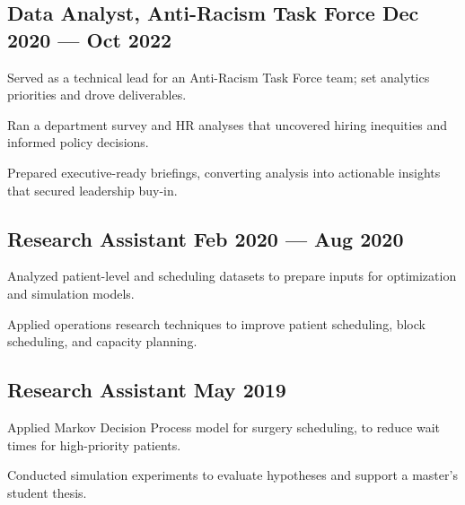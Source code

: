 \subsection{{Data Analyst, Anti-Racism Task Force \hfill Dec 2020 --- Oct 2022}}
\begin{zitemize}
    \setlength\itemsep{0.4em}
    \item Served as a technical lead for an Anti-Racism Task Force team; set analytics priorities and drove deliverables.
    \item Ran a department survey and HR analyses that uncovered hiring inequities and informed policy decisions.
    \item Prepared executive-ready briefings, converting analysis into actionable insights that secured leadership buy-in.
\end{zitemize}
\vspace{0.75em}


\subsection{{Research Assistant \hfill Feb 2020 --- Aug 2020}}
\begin{zitemize}
    \setlength\itemsep{0.4em}
    \item Analyzed patient-level and scheduling datasets to prepare inputs for optimization and simulation models.
    \item Applied operations research techniques to improve patient scheduling, block scheduling, and capacity planning.
\end{zitemize}
\vspace{0.75em}

\subsection{{Research Assistant \hfill May 2019}}
\begin{zitemize}
    \setlength\itemsep{0.4em}
    \item Applied Markov Decision Process model for surgery scheduling, to reduce wait times for high-priority patients.
    \item Conducted simulation experiments to evaluate hypotheses and support a master's student thesis.
\end{zitemize}

